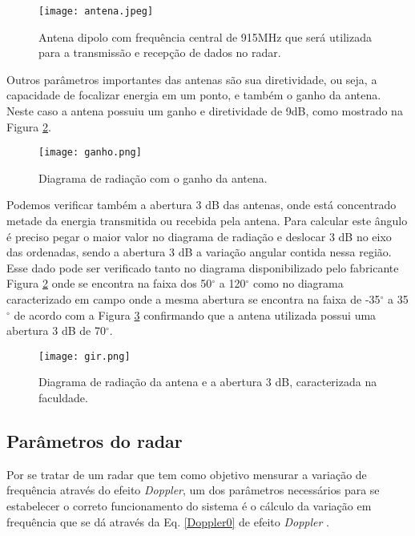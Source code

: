 \begin{figure}[H]
    \centering
   \texttt{[image: antena.jpeg]}
   \caption{Antena dipolo com frequência central de 915MHz que será utilizada para a transmissão e recepção de dados no radar.}
   \label{antena}
    \end{figure}

Outros parâmetros importantes das antenas são sua diretividade, ou seja, a capacidade de focalizar energia em um ponto, e também o ganho da antena. Neste caso a antena possuiu um ganho e diretividade de 9dB, como mostrado na Figura \ref{ganho}.

\begin{figure}[H]
    \centering
   \texttt{[image: ganho.png]}
   \caption{Diagrama de radiação com o ganho da antena.}
   \label{ganho}
    \end{figure}

Podemos verificar também a abertura 3 dB das antenas, onde está concentrado metade da energia transmitida ou recebida pela antena. Para calcular este ângulo é preciso pegar o maior valor no diagrama de radiação e deslocar 3 dB no eixo das ordenadas, sendo a abertura 3 dB a variação angular contida nessa região. Esse dado pode ser verificado tanto no diagrama disponibilizado pelo fabricante Figura \ref{ganho} onde se encontra na faixa dos 50$^{\circ}$ a 120$^{\circ}$ como no diagrama caracterizado em campo onde a mesma abertura se encontra na faixa de -35$^{\circ}$ a 35$^{\circ}$ de acordo com a Figura \ref{dr} confirmando que a antena utilizada possui uma abertura 3 dB de 70$^{\circ}$. 

\begin{figure}[H]
    \centering
   \texttt{[image: gir.png]}
   \caption{Diagrama de radiação da antena e a
abertura 3 dB, caracterizada na faculdade.}
   \label{dr}
    \end{figure}


\subsection{Parâmetros do radar}


 Por se tratar de um radar que tem como objetivo mensurar a variação de frequência através do efeito \emph{Doppler}, um dos parâmetros necessários para se estabelecer o correto funcionamento do sistema é o cálculo da variação em frequência que se dá através da Eq. \ref{Doppler0} de efeito \emph{Doppler} \cite{young2009fisica}. 

